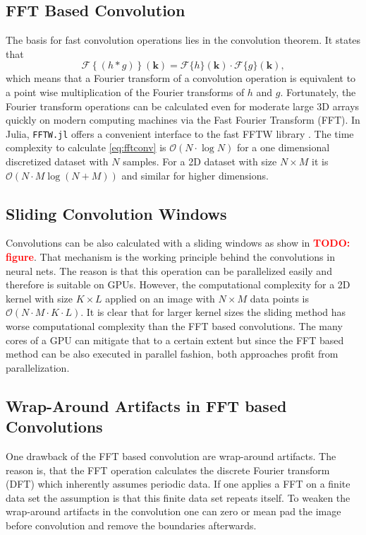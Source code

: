 \documentclass{juliacon}
\newcommand\todo[1]{\textcolor{red}{\textbf{TODO: #1}}}
\begin{document}
\subsection{FFT Based Convolution}
    The basis for fast convolution operations lies in the convolution theorem. It states that
    \begin{equation}
        \mathcal F\left\{(h * g)\right\}(\mathbf k) = \mathcal F\{h\} (\mathbf k) \cdot \mathcal F\{g\} (\mathbf k),
        \label{eq:fftconv}
    \end{equation} 
        which means that a Fourier transform of a  convolution operation is equivalent to a point wise multiplication of the Fourier transforms 
        of $h$ and $g$.
        Fortunately, the Fourier transform operations can be calculated even for moderate large 3D arrays quickly on modern computing machines via
        the Fast Fourier Transform (FFT).
        In Julia, \verb|FFTW.jl| offers a convenient interface to the fast FFTW library \cite{FFTW05}.
        The time complexity to calculate \autoref{eq:fftconv} is $\mathcal{O}(N \cdot \log N)$ for a one dimensional discretized dataset with $N$ samples.
        For a 2D dataset with size $N \times M$ it is $\mathcal{O}(N \cdot M \log(N + M))$ and similar for higher dimensions.

\subsection{Sliding Convolution Windows}
Convolutions can be also calculated with a sliding windows as show in \todo{figure}. 
That mechanism is the working principle
behind the convolutions in neural nets. The reason is that this operation can be parallelized easily and therefore 
is suitable on GPUs. However, the computational complexity for a 2D kernel with size $K \times L$ applied on an image with
$N \times M$ data points is $\mathcal O(N \cdot M \cdot K \cdot L)$. It is clear that for larger kernel sizes the sliding method 
has worse computational complexity than the FFT based convolutions. The many cores of a GPU can mitigate that to a certain extent
but since the FFT based method can be also executed in parallel fashion, both approaches profit from parallelization.


\subsection{Wrap-Around Artifacts in FFT based Convolutions}
    One drawback of the FFT based convolution are wrap-around artifacts. The reason is, that the FFT operation calculates the discrete
    Fourier transform (DFT) which inherently assumes periodic data. If one applies a FFT on a finite data set the assumption is that
    this finite data set repeats itself. 
    To weaken the wrap-around artifacts in the convolution one can zero or mean pad the image before convolution and remove the boundaries afterwards.
\end{document}
